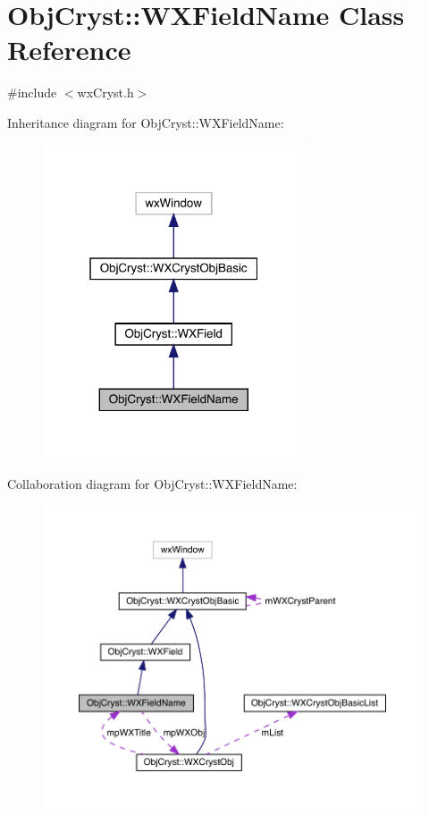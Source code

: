 \hypertarget{class_obj_cryst_1_1_w_x_field_name}{}\section{Obj\+Cryst\+::W\+X\+Field\+Name Class Reference}
\label{class_obj_cryst_1_1_w_x_field_name}


{\ttfamily \#include $<$wx\+Cryst.\+h$>$}



Inheritance diagram for Obj\+Cryst\+::W\+X\+Field\+Name\+:
\nopagebreak
\begin{figure}[H]
\begin{center}
\leavevmode
\includegraphics[width=220pt]{class_obj_cryst_1_1_w_x_field_name__inherit__graph}
\end{center}
\end{figure}


Collaboration diagram for Obj\+Cryst\+::W\+X\+Field\+Name\+:
\nopagebreak
\begin{figure}[H]
\begin{center}
\leavevmode
\includegraphics[width=350pt]{class_obj_cryst_1_1_w_x_field_name__coll__graph}
\end{center}
\end{figure}
